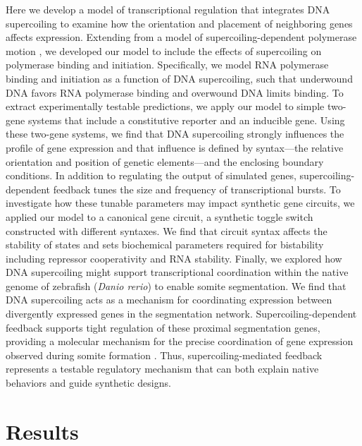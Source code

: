 \documentclass[11pt]{article} %
\begin{document}
Here we develop a model of transcriptional regulation that integrates DNA supercoiling to examine how the orientation and placement of neighboring genes affects expression. Extending from a model of supercoiling-dependent polymerase motion \parencite{sevierPropertiesGeneExpression2018}, we developed our model to include the effects of supercoiling on polymerase binding and initiation. Specifically, we model RNA polymerase binding and initiation as a function of DNA supercoiling, such that underwound DNA favors RNA polymerase binding and overwound DNA limits binding. To extract experimentally testable predictions, we  apply our model to simple two-gene systems that include a constitutive reporter and an inducible gene. Using these two-gene systems, we find that DNA supercoiling strongly influences the profile of gene expression and that influence is defined by syntax---the relative orientation and position of genetic elements---and the enclosing boundary conditions. In addition to regulating the output of simulated genes, supercoiling-dependent feedback tunes the size and frequency of transcriptional bursts. To investigate how these tunable parameters may impact synthetic gene circuits, we applied our model to a canonical gene circuit, a synthetic toggle switch constructed with different syntaxes.
We find that circuit syntax affects the stability of states and sets biochemical parameters required for bistability including repressor cooperativity and RNA stability. Finally, we explored how DNA supercoiling might support transcriptional coordination within the native genome of zebrafish (\textit{Danio rerio}) to enable somite segmentation. We find that DNA supercoiling acts as a mechanism for coordinating expression between divergently expressed genes in the segmentation network. Supercoiling-dependent feedback supports tight regulation of these proximal segmentation genes, providing a molecular mechanism for the precise coordination of gene expression observed during somite formation \parencite{zinaniPairingSegmentationClock2021}. Thus, supercoiling-mediated feedback represents a testable regulatory mechanism that can both explain native behaviors and guide synthetic designs.



\FloatBarrier

\FloatBarrier
\section{Results}
\FloatBarrier
\end{document}
